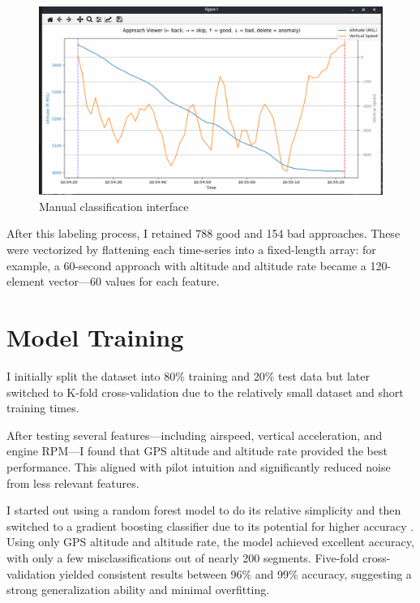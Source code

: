 \documentclass[conference]{IEEEtran}
\begin{document}
\begin{figure}[H]
    \centerline{\includegraphics[width=\linewidth]{figs/approach_viewer.png}}
    \caption{Manual classification interface}
\end{figure}
  
After this labeling process, I retained 788 good and 154 bad approaches. These were vectorized by flattening each time-series into a fixed-length array: for example, a 60-second approach with altitude and altitude rate became a 120-element vector—60 values for each feature.

\section{Model Training}
I initially split the dataset into 80\% training and 20\% test data but later switched to K-fold cross-validation due to the relatively small dataset and short training times.

After testing several features—including airspeed, vertical acceleration, and engine RPM—I found that GPS altitude and altitude rate provided the best performance. This aligned with pilot intuition and significantly reduced noise from less relevant features.

I started out using a random forest model to do its relative simplicity and then switched to a gradient boosting classifier due to its potential for higher accuracy \cite{chen2016xgboost}. Using only GPS altitude and altitude rate, the model achieved excellent accuracy, with only a few misclassifications out of nearly 200 segments. Five-fold cross-validation yielded consistent results between 96\% and 99\% accuracy, suggesting a strong generalization ability and minimal overfitting.
\end{document}
